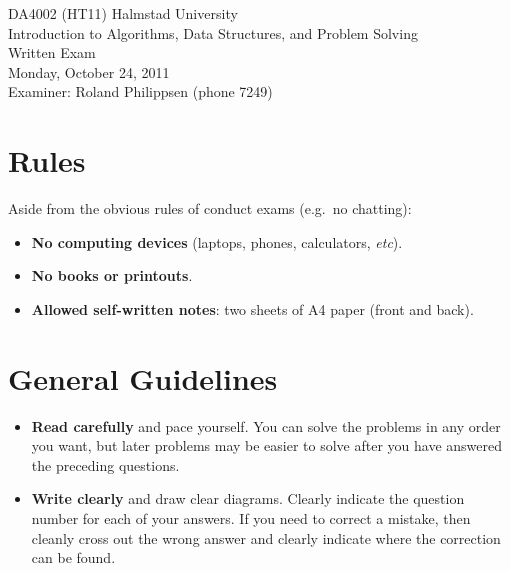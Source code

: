 \documentclass[a4paper]{article}
\newcounter{question}
\begin{document}
\pagestyle{empty}
\thispagestyle{empty}



\noindent
\begin{minipage}{\columnwidth}
  \centering
  \Large
  DA4002 (HT11) Halmstad University\\
  Introduction to Algorithms, Data Structures, and Problem Solving\\[3\baselineskip]
  \Huge
  Written Exam\\
  \Large
  Monday, October 24, 2011\\[2\baselineskip]
  Examiner: Roland Philippsen (phone 7249)
\end{minipage}

\vfill



\section*{Rules}

Aside from the obvious rules of conduct exams (e.g.\ no chatting):

\begin{itemize}
\item
  \textbf{No computing devices} (laptops, phones, calculators, \emph{etc}).
\item
  \textbf{No books or printouts}.
\item
  \textbf{Allowed self-written notes}: two sheets of A4 paper (front and back).
\end{itemize}



\section*{General Guidelines}

\begin{itemize}
\item
  \textbf{Read carefully} and pace yourself.
  You can solve the problems in any order you want, but later problems may be easier to solve after you have answered the preceding questions.
\item
  \textbf{Write clearly} and draw clear diagrams.
  Clearly indicate the question number for each of your answers.
  If you need to correct a mistake, then cleanly cross out the wrong answer and clearly indicate where the correction can be found.
\end{itemize}
\end{document}
